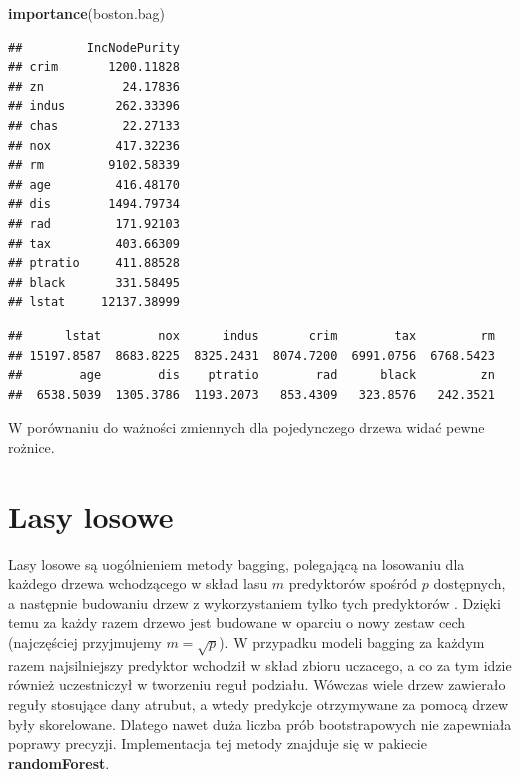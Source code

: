 \documentclass[]{book}
\newenvironment{Shaded}{\begin{snugshade}}{\end{snugshade}}
\newcommand{\KeywordTok}[1]{\textcolor[rgb]{0.13,0.29,0.53}{\textbf{#1}}}
\newcommand{\NormalTok}[1]{#1}
\newcommand{\OperatorTok}[1]{\textcolor[rgb]{0.81,0.36,0.00}{\textbf{#1}}}
\theoremstyle{plain}
\theoremstyle{definition}
\begin{document}
\begin{Shaded}
\begin{Highlighting}[]
\KeywordTok{importance}\NormalTok{(boston.bag)}
\end{Highlighting}
\end{Shaded}

\begin{verbatim}
##         IncNodePurity
## crim       1200.11828
## zn           24.17836
## indus       262.33396
## chas         22.27133
## nox         417.32236
## rm         9102.58339
## age         416.48170
## dis        1494.79734
## rad         171.92103
## tax         403.66309
## ptratio     411.88528
## black       331.58495
## lstat     12137.38999
\end{verbatim}

\begin{Shaded}
\end{Shaded}

\begin{verbatim}
##      lstat        nox      indus       crim        tax         rm 
## 15197.8587  8683.8225  8325.2431  8074.7200  6991.0756  6768.5423 
##        age        dis    ptratio        rad      black         zn 
##  6538.5039  1305.3786  1193.2073   853.4309   323.8576   242.3521
\end{verbatim}

W porównaniu do ważności zmiennych dla pojedynczego drzewa widać pewne rożnice.

\hypertarget{lasy-losowe}{%
\section{Lasy losowe}\label{lasy-losowe}}

Lasy losowe są uogólnieniem metody bagging, polegającą na losowaniu dla każdego drzewa wchodzącego w skład lasu \(m\) predyktorów spośród \(p\) dostępnych, a następnie budowaniu drzew z wykorzystaniem tylko tych predyktorów \citep{ho1995}. Dzięki temu za każdy razem drzewo jest budowane w oparciu o nowy zestaw cech (najczęściej przyjmujemy \(m=\sqrt{p}\)). W przypadku modeli bagging za każdym razem najsilniejszy predyktor wchodził w skład zbioru uczacego, a co za tym idzie również uczestniczył w tworzeniu reguł podziału. Wówczas wiele drzew zawierało reguły stosujące dany atrubut, a wtedy predykcje otrzymywane za pomocą drzew były skorelowane. Dlatego nawet duża liczba prób bootstrapowych nie zapewniała poprawy precyzji. Implementacja tej metody znajduje się w pakiecie \textbf{randomForest}.
\end{document}
